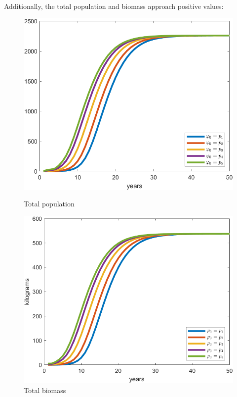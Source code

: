 Additionally, the total population and biomass approach positive values:

\begin{figure}[H]
	\centering
	\begin{minipage}{.43\textwidth}
		\includegraphics[width=\linewidth]{Images/F=1/total_pop_when_f=1}
		\caption{Total population}
		\label{fig:totalpopwhenf=1}
	\end{minipage} \quad 
	\centering
	\begin{minipage}{.43\textwidth}
		\includegraphics[width=\linewidth]{Images/F=1/total_biomass_when_f=1}
		\caption{Total biomass}
		\label{fig:totalbiomasswhenf=1}
	\end{minipage}
\end{figure}

